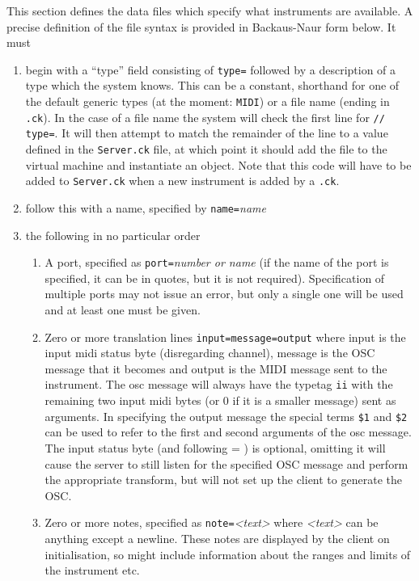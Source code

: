 \documentclass[12pt]{article}
\begin{document}
This section defines the data files which specify what instruments are available. A precise definition of the file syntax is provided in 
Backaus-Naur form below. 
It must 
\begin{enumerate} [\bfseries 1.]
\item{begin with a ``type'' field consisting of \texttt{type=} followed by a description of a type which the system knows. This can be
a constant, shorthand for one of the default generic types (at the moment: \texttt{MIDI}) or a file name (ending in \texttt{.ck}). In the case of a file name
the system will check the first line for \texttt{// type=}. It will then attempt to match the remainder of the line to a value defined in the \texttt{Server.ck}
file, at which point it should add the file to the virtual machine and instantiate an object. Note that this code will have to be added to \texttt{Server.ck}
when a new instrument is added by a \texttt{.ck}.}
\item{follow this with a name, specified by \texttt{name=}\textit{name}}
\item{the following in no particular order}
	\begin{enumerate} [\bf a.]
		\item A port, specified as \texttt{port=}\textit{number or name} (if the name of the port is specified, it can be in quotes,
			 but it is not required). Specification of multiple ports may not issue an error, but only a single one will be used and at least one must be given.
		\item Zero or more translation lines \texttt{input=message=output} where input is the input midi
			 status byte (disregarding channel), message is the OSC message that it becomes and output is the MIDI message sent to the instrument.
	 		The osc message will always have the typetag \texttt{ii} with the remaining two input midi bytes (or 0 if it is a smaller message) sent as 
	 		arguments. In specifying the output message the special terms \texttt{\$1} and \texttt{\$2} can be used to refer to the first and second arguments
			 of the osc message. The input status byte (and following = ) is optional, omitting it will cause the server to still listen for the specified OSC
			 message and perform the appropriate transform, but will not set up the client to generate the OSC.
		\item Zero or more notes, specified as \texttt{note=}\textit{<text>} where \textit{<text>} can be anything except a newline. These notes are displayed by
			the client on initialisation, so might include information about the ranges and limits of the instrument etc.
	 \end{enumerate}
\end{enumerate}
\end{document}
